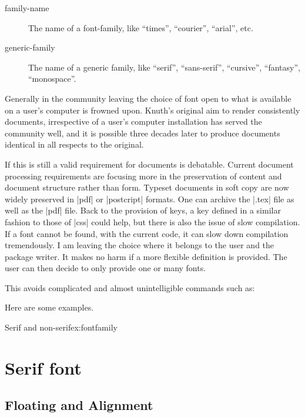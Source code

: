 \begin{decription}
\begin{description}
\item[family-name] The name of a font-family, like “times”, “courier”, “arial”, etc.
\item[generic-family] The name of a generic family, like “serif”, “sans-serif”, “cursive”, “fantasy”, “monospace”.
\end{description}

Generally in the \tex community leaving the choice of font  open to what is available on a user’s computer is frowned upon. Knuth’s original aim to render consistently documents, irrespective of a user’s computer installation has served the community well, and it is possible three decades later to produce documents identical in all respects to the original. 

If this is still a valid requirement for documents is debatable. Current document processing requirements are focusing more in the preservation of content and document structure rather than form. Typeset documents in soft copy are now widely preserved in |pdf| or |postcript|  formats. One can archive the |.tex| file as well as the |pdf| file.  Back to the provision of keys, a key defined in a 
similar fashion to those of |css| could help, but there is also the issue of slow compilation. If a font cannot be
found, with the current code, it can slow down compilation tremendously. I am leaving the choice where it belongs to the user and the package writer. It makes no harm if a more flexible definition is provided. The user can then decide to only provide one or many fonts. 

This avoids complicated and almost unintelligible commands such as:

\begin{dispListing}
\end{dispListing}

Here are some examples. 

\begin{texexample}{Serif and non-serif}{ex:fontfamily}
\chapter{Serif font}
\lorem
\end{texexample}


\section{Floating and Alignment} 


\end{decription}
